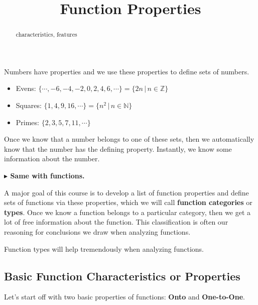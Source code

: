 \documentclass{ximera}
\title{Function Properties}
\begin{document}
\begin{abstract}
characteristics, features
\end{abstract}
\maketitle





Numbers have properties and we use these properties to define sets of numbers. 



\begin{itemize}
\item Evens:  $\{ \cdots, -6, -4, -2, 0, 2, 4, 6, \cdots \} = \{ 2n   \, | \, n \in \mathbb{Z} \}$
\item Squares:  $\{ 1, 4, 9, 16, \cdots \} = \{ n^2   \, | \, n \in \mathbb{N} \}$
\item Primes:  $\{ 2, 3, 5, 7, 11,  \cdots \}$
\end{itemize}

Once we know that a number belongs to one of these sets, then we automatically know that the number has the defining property. Instantly, we know some information about the number. 


\textbf{\textcolor{red!70!black}{$\blacktriangleright$ Same with functions.}}  



A major goal of this course is to develop a list of function properties and define sets of functions via these properties, which we will call \textbf{function categories} or \textbf{types}.  Once we know a function belongs to a particular category, then we get a lot of free information about the function. This classification is often our reasoning for conclusions we draw when analyzing functions. 


Function types will help tremendously when analyzing functions.






\subsection*{Basic Function Characteristics or Properties}


Let's start off with two basic properties of functions: \textbf{Onto} and \textbf{One-to-One}.
\end{document}
